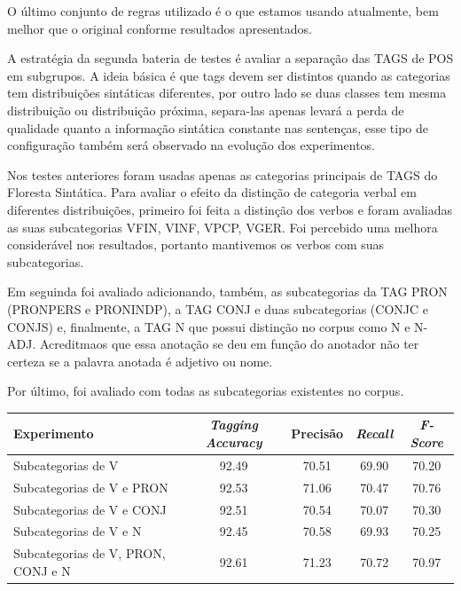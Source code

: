 O último conjunto de regras utilizado é o que estamos usando atualmente, bem melhor que o original conforme resultados apresentados. 

A estratégia da segunda bateria de testes é avaliar a separação das TAGS de POS em subgrupos. A ideia básica é que tags devem ser distintos quando as categorias tem distribuições sintáticas diferentes, por outro lado se duas classes tem mesma distribuição ou distribuição próxima, separa-las apenas levará a perda de qualidade quanto a informação sintática constante nas sentenças, esse tipo de configuração também será observado na evolução dos experimentos.

Nos testes anteriores foram usadas apenas as categorias principais de TAGS do Floresta Sintática. Para avaliar o efeito da distinção de categoria verbal em diferentes distribuições, primeiro foi feita a distinção dos verbos e foram avaliadas as suas subcategorias VFIN, VINF, VPCP, VGER. Foi percebido uma melhora considerável nos resultados, portanto mantivemos os verbos com suas subcategorias. 

Em seguinda foi avaliado adicionando, também, as subcategorias da TAG PRON (PRONPERS e PRONINDP), a TAG CONJ e duas subcategorias (CONJC e CONJS) e, finalmente, a TAG N que possui distinção no corpus como N e N-ADJ. Acreditmaos que essa anotação se deu em função do anotador não ter certeza se a palavra anotada é adjetivo ou nome.

Por último, foi avaliado com todas as subcategorias existentes no corpus.

\begin{center}
   \footnotesize
	\begin{tabular}{|l|c|c|c|c|}
		\hline
		\textbf{Experimento} &  \textbf{\emph{Tagging Accuracy}} & \textbf{Precisão} & \textbf{\emph{Recall}} & \textbf{\emph{F-Score}} \\
		\hline
		Subcategorias de V & 92.49 & 70.51 & 69.90 & 70.20\\
		\hline		
		Subcategorias de V e PRON & 92.53 & 71.06 & 70.47 & 70.76\\
		\hline		
		Subcategorias de V e CONJ & 92.51 & 70.54 & 70.07 & 70.30\\
		\hline		
		Subcategorias de V e N & 92.45 & 70.58 & 69.93 & 70.25\\
		\hline
		Subcategorias de V, PRON, CONJ e N & 92.61 & 71.23 & 70.72 & 70.97\\
		\hline
	\end{tabular}
	\label{tab:segundo_experimento}
\end{center}

